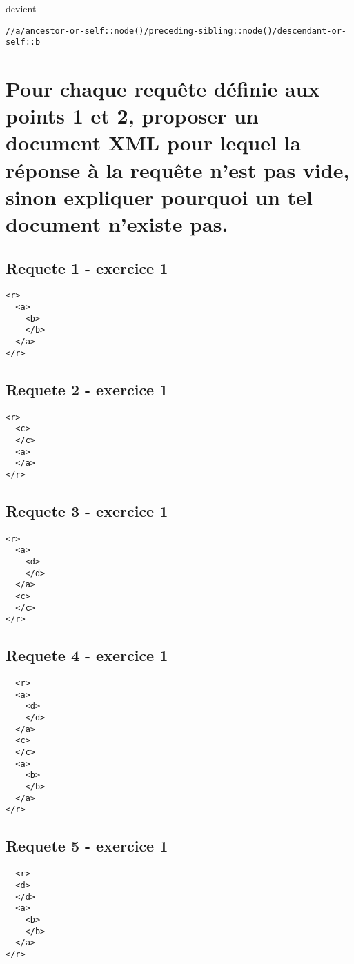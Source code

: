 devient

\begin{verbatim}
//a/ancestor-or-self::node()/preceding-sibling::node()/descendant-or-self::b
\end{verbatim}


\section{Pour chaque requête définie aux points 1 et 2, proposer un document XML pour lequel la réponse à la requête n’est pas vide, sinon expliquer pourquoi un tel document n’existe pas.}
\subsection{Requete 1 - exercice 1}
\begin{verbatim}
<r>
  <a>
    <b>
    </b>
  </a>
</r>
\end{verbatim}

\subsection{Requete 2 - exercice 1}
\begin{verbatim}
<r>
  <c>
  </c>
  <a>
  </a>
</r>
\end{verbatim}

\subsection{Requete 3 - exercice 1}
\begin{verbatim}
<r>
  <a>
    <d>
    </d>
  </a>
  <c>
  </c>
</r>
\end{verbatim}

\subsection{Requete 4 - exercice 1}
\begin{verbatim}
  <r>
  <a>
    <d>
    </d>
  </a>
  <c>
  </c>
  <a>
    <b>
    </b>
  </a>
</r>
\end{verbatim}

\subsection{Requete 5 - exercice 1}
\begin{verbatim}
  <r>
  <d>
  </d>
  <a>
    <b>
    </b>
  </a>
</r>
\end{verbatim}

